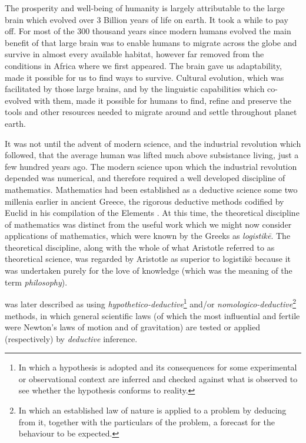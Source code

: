 \documentclass[10pt,titlepage]{book}
\begin{document}
The prosperity and well-being of humanity is largely attributable to the large brain which evolved over 3 Billion years of life on earth.
It took a while to pay off.
For most of the 300 thousand years since modern humans evolved the main benefit of that large brain was to enable humans to migrate across the globe and survive in almost every available habitat, however far removed from the conditions in Africa where we first appeared.
The brain gave us adaptability, made it possible for us to find ways to survive.
Cultural evolution, which was facilitated by those large brains, and by the linguistic capabilities which co-evolved with them, made it possible for humans to find, refine and preserve the tools and other resources needed to migrate around and settle throughout planet earth.

It was not until the advent of modern science, and the industrial revolution which followed, that the average human was lifted much above subsistance living, just a few hundred years ago.
The modern science upon which the industrial revolution depended was numerical, and therefore required a well developed discipline of mathematics.
Mathematics had been established as a deductive science some two millenia earlier in ancient Greece, the rigorous deductive methods codified by Euclid in his compilation of the Elements \cite{euclidEL1}.
At this time, the theoretical discipline of mathematics was distinct from the useful work which we might now consider applications of mathematics, which were known by the Greeks as \emph{logistikē}.
The theoretical discipline, along with the whole of what Aristotle referred to as theoretical science, was regarded by Aristotle as superior to logistikē because it was undertaken purely for the love of knowledge (which was the meaning of the term \emph{philosophy}).

was later described as using \emph{hypothetico-deductive}\footnote{In which a hypothesis is adopted and its consequences for some experimental or observational context are inferred and checked against what is observed to see whether the hypothesis conforms to reality.} and/or \emph{nomologico-deductive}\footnote{In which an established law of nature is applied to a problem by deducing from it, together with the particulars of the problem, a forecast for the behaviour to be expected.} methods, in which general scientific laws (of which the most influential and fertile were Newton's laws of motion and of gravitation) are tested or applied (respectively) by \emph{deductive} inference.
\end{document}
